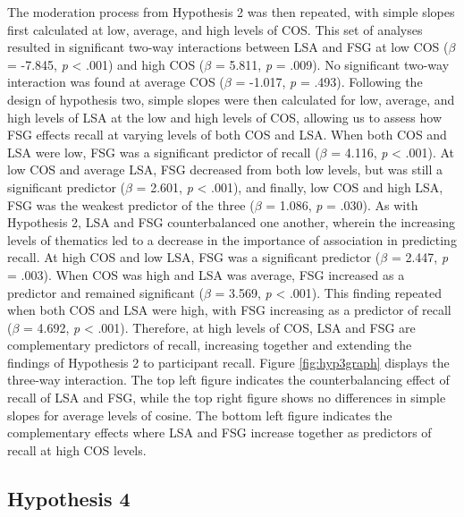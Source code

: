 \documentclass[english,man]{apa6}
\theoremstyle{definition}
\theoremstyle{definition}
\theoremstyle{definition}
\theoremstyle{remark}
\begin{document}
The moderation process from Hypothesis 2 was then repeated, with simple
slopes first calculated at low, average, and high levels of COS. This
set of analyses resulted in significant two-way interactions between LSA
and FSG at low COS (\(\beta\) = -7.845, \emph{p} \textless{} .001) and
high COS (\(\beta\) = 5.811, \emph{p} = .009). No significant two-way
interaction was found at average COS (\(\beta\) = -1.017, \emph{p} =
.493). Following the design of hypothesis two, simple slopes were then
calculated for low, average, and high levels of LSA at the low and high
levels of COS, allowing us to assess how FSG effects recall at varying
levels of both COS and LSA. When both COS and LSA were low, FSG was a
significant predictor of recall (\(\beta\) = 4.116, \emph{p} \textless{}
.001). At low COS and average LSA, FSG decreased from both low levels,
but was still a significant predictor (\(\beta\) = 2.601, \emph{p}
\textless{} .001), and finally, low COS and high LSA, FSG was the
weakest predictor of the three (\(\beta\) = 1.086, \emph{p} = .030). As
with Hypothesis 2, LSA and FSG counterbalanced one another, wherein the
increasing levels of thematics led to a decrease in the importance of
association in predicting recall. At high COS and low LSA, FSG was a
significant predictor (\(\beta\) = 2.447, \emph{p} = .003). When COS was
high and LSA was average, FSG increased as a predictor and remained
significant (\(\beta\) = 3.569, \emph{p} \textless{} .001). This finding
repeated when both COS and LSA were high, with FSG increasing as a
predictor of recall (\(\beta\) = 4.692, \emph{p} \textless{} .001).
Therefore, at high levels of COS, LSA and FSG are complementary
predictors of recall, increasing together and extending the findings of
Hypothesis 2 to participant recall. Figure \ref{fig:hyp3graph} displays
the three-way interaction. The top left figure indicates the
counterbalancing effect of recall of LSA and FSG, while the top right
figure shows no differences in simple slopes for average levels of
cosine. The bottom left figure indicates the complementary effects where
LSA and FSG increase together as predictors of recall at high COS
levels.

\subsection{Hypothesis 4}\label{hypothesis-4}
\end{document}
